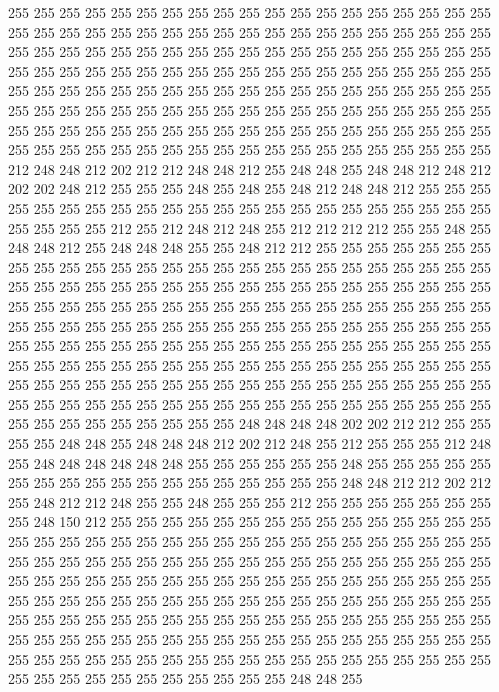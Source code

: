 255 255 255 255 255 255 255 255 255 255 255 255 255 255 255 255 255 255 255 255
255 255 255 255 255 255 255 255 255 255 255 255 255 255 255 255 255 255 255 255
255 255 255 255 255 255 255 255 255 255 255 255 255 255 255 255 255 255 255 255
255 255 255 255 255 255 255 255 255 255 255 255 255 255 255 255 255 255 255 255
255 255 255 255 255 255 255 255 255 255 255 255 255 255 255 255 255 255 255 255
255 255 255 255 255 255 255 255 255 255 255 255 255 255 255 255 255 255 255 255
255 255 255 255 255 255 255 255 255 255 255 255 255 255 255 255 255 255 255 255
255 255 255 255 255 255 255 255 255 255 255 255 212 248 248 212 202 212 212 248
248 212 255 248 248 255 248 248 212 248 212 202 202 248 212 255 255 255 248 255
248 255 248 212 248 248 212 255 255 255 255 255 255 255 255 255 255 255 255 255
255 255 255 255 255 255 255 255 255 255 255 255 255 212 255 212 248 212 248 255
212 212 212 212 255 255 248 255 248 248 212 255 248 248 248 255 255 248 212 212
255 255 255 255 255 255 255 255 255 255 255 255 255 255 255 255 255 255 255 255
255 255 255 255 255 255 255 255 255 255 255 255 255 255 255 255 255 255 255 255
255 255 255 255 255 255 255 255 255 255 255 255 255 255 255 255 255 255 255 255
255 255 255 255 255 255 255 255 255 255 255 255 255 255 255 255 255 255 255 255
255 255 255 255 255 255 255 255 255 255 255 255 255 255 255 255 255 255 255 255
255 255 255 255 255 255 255 255 255 255 255 255 255 255 255 255 255 255 255 255
255 255 255 255 255 255 255 255 255 255 255 255 255 255 255 255 255 255 255 255
255 255 255 255 255 255 255 255 255 255 255 255 255 255 255 255 255 255 255 255
255 255 255 255 255 255 255 255 248 248 248 248 202 202 212 212 255 255 255 255
248 248 255 248 248 248 212 202 212 248 255 212 255 255 255 212 248 255 248 248
248 248 248 248 255 255 255 255 255 255 248 255 255 255 255 255 255 255 255 255
255 255 255 255 255 255 255 255 255 248 248 212 212 202 212 255 248 212 212 248
255 255 248 255 255 255 212 255 255 255 255 255 255 255 255 248 150 212 255 255
255 255 255 255 255 255 255 255 255 255 255 255 255 255 255 255 255 255 255 255
255 255 255 255 255 255 255 255 255 255 255 255 255 255 255 255 255 255 255 255
255 255 255 255 255 255 255 255 255 255 255 255 255 255 255 255 255 255 255 255
255 255 255 255 255 255 255 255 255 255 255 255 255 255 255 255 255 255 255 255
255 255 255 255 255 255 255 255 255 255 255 255 255 255 255 255 255 255 255 255
255 255 255 255 255 255 255 255 255 255 255 255 255 255 255 255 255 255 255 255
255 255 255 255 255 255 255 255 255 255 255 255 255 255 255 255 255 255 255 255
255 255 255 255 255 255 255 255 255 255 255 255 255 255 255 255 255 248 248 255
